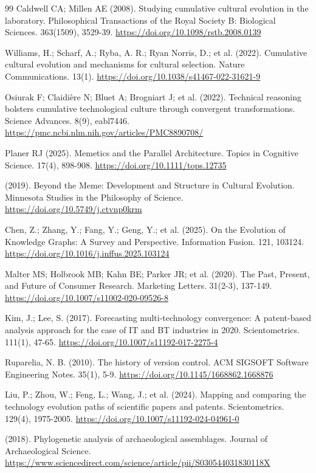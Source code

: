 \documentclass[11pt]{article}
\begin{document}
\begin{thebibliography}{99}
Caldwell CA; Millen AE (2008). Studying cumulative cultural evolution in the laboratory. Philosophical Transactions of the Royal Society B: Biological Sciences. 363(1509), 3529-39. \url{https://doi.org/10.1098/rstb.2008.0139}

Williams, H.; Scharf, A.; Ryba, A. R.; Ryan Norris, D.; et al. (2022). Cumulative cultural evolution and mechanisms for cultural selection. Nature Communications. 13(1). \url{https://doi.org/10.1038/s41467-022-31621-9}

Osiurak F; Claidière N; Bluet A; Brogniart J; et al. (2022). Technical reasoning bolsters cumulative technological culture through convergent transformations. Science Advances. 8(9), eabl7446. \url{https://pmc.ncbi.nlm.nih.gov/articles/PMC8890708/}

Planer RJ (2025). Memetics and the Parallel Architecture. Topics in Cognitive Science. 17(4), 898-908. \url{https://doi.org/10.1111/tops.12735}

(2019). Beyond the Meme: Development and Structure in Cultural Evolution. Minnesota Studies in the Philosophy of Science. \url{https://doi.org/10.5749/j.ctvnp0krm}

Chen, Z.; Zhang, Y.; Fang, Y.; Geng, Y.; et al. (2025). On the Evolution of Knowledge Graphs: A Survey and Perspective. Information Fusion. 121, 103124. \url{https://doi.org/10.1016/j.inffus.2025.103124}

Malter MS; Holbrook MB; Kahn BE; Parker JR; et al. (2020). The Past, Present, and Future of Consumer Research. Marketing Letters. 31(2-3), 137-149. \url{https://doi.org/10.1007/s11002-020-09526-8}

Kim, J.; Lee, S. (2017). Forecasting multi-technology convergence: A patent-based analysis approach for the case of IT and BT industries in 2020. Scientometrics. 111(1), 47-65. \url{https://doi.org/10.1007/s11192-017-2275-4}

Ruparelia, N. B. (2010). The history of version control. ACM SIGSOFT Software Engineering Notes. 35(1), 5-9. \url{https://doi.org/10.1145/1668862.1668876}

Liu, P.; Zhou, W.; Feng, L.; Wang, J.; et al. (2024). Mapping and comparing the technology evolution paths of scientific papers and patents. Scientometrics. 129(4), 1975-2005. \url{https://doi.org/10.1007/s11192-024-04961-0}

(2018). Phylogenetic analysis of archaeological assemblages. Journal of Archaeological Science. \url{https://www.sciencedirect.com/science/article/pii/S030544031830118X}

\end{thebibliography}

\fussy
\end{document}

